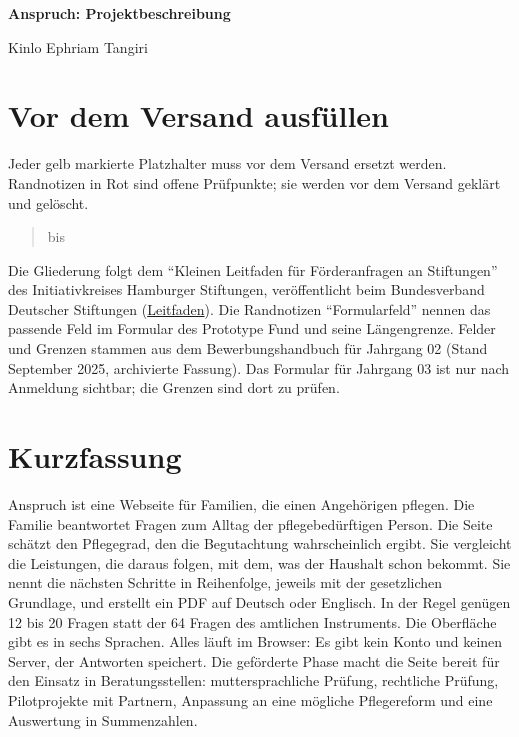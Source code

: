 \documentclass[11pt,a4paper,parskip=half-]{scrartcl}
\begin{document}
{\LARGE\sffamily\bfseries Anspruch: Projektbeschreibung\par}
Kinlo Ephriam Tangiri\par

\section*{Vor dem Versand ausfüllen}
Jeder gelb markierte Platzhalter muss vor dem Versand ersetzt werden.
Randnotizen in Rot sind offene Prüfpunkte; sie werden vor dem Versand geklärt und gelöscht.
\begin{quote}\raggedright
{} \textperiodcentered{}
 bis  \textperiodcentered{}
 \textperiodcentered{}
 \textperiodcentered{}
 \textperiodcentered{}
 \textperiodcentered{}
 \textperiodcentered{}
\end{quote}
Die Gliederung folgt dem \enquote{Kleinen Leitfaden für Förderanfragen an Stiftungen}
des Initiativkreises Hamburger Stiftungen, veröffentlicht beim Bundesverband Deutscher
Stiftungen (\href{https://www.stiftungen.org/fileadmin/stiftungen_org/Verband/Was_wir_tun/Veranstaltungen/AK-Foerderstiftungen/Leitfaden-fuer-Foerderanfragen-an-Stiftungen.pdf}{Leitfaden}).
Die Randnotizen \enquote{Formularfeld} nennen das passende Feld im Formular des Prototype Fund
und seine Längengrenze. Felder und Grenzen stammen aus dem Bewerbungshandbuch für Jahrgang 02
(Stand September 2025, archivierte Fassung). Das Formular für Jahrgang 03 ist nur nach Anmeldung
sichtbar; die Grenzen sind dort zu prüfen.

\section{Kurzfassung}
%
Anspruch ist eine Webseite für Familien, die einen Angehörigen pflegen.
Die Familie beantwortet Fragen zum Alltag der pflegebedürftigen Person.
Die Seite schätzt den Pflegegrad, den die Begutachtung wahrscheinlich ergibt.
Sie vergleicht die Leistungen, die daraus folgen, mit dem, was der Haushalt schon bekommt.
Sie nennt die nächsten Schritte in Reihenfolge, jeweils mit der gesetzlichen Grundlage,
und erstellt ein PDF auf Deutsch oder Englisch.
In der Regel genügen 12 bis 20 Fragen statt der 64 Fragen des amtlichen Instruments.
Die Oberfläche gibt es in sechs Sprachen.
Alles läuft im Browser: Es gibt kein Konto und keinen Server, der Antworten speichert.
Die geförderte Phase macht die Seite bereit für den Einsatz in Beratungsstellen:
muttersprachliche Prüfung, rechtliche Prüfung, Pilotprojekte mit Partnern, Anpassung an eine
mögliche Pflegereform und eine Auswertung in Summenzahlen.
\end{document}
